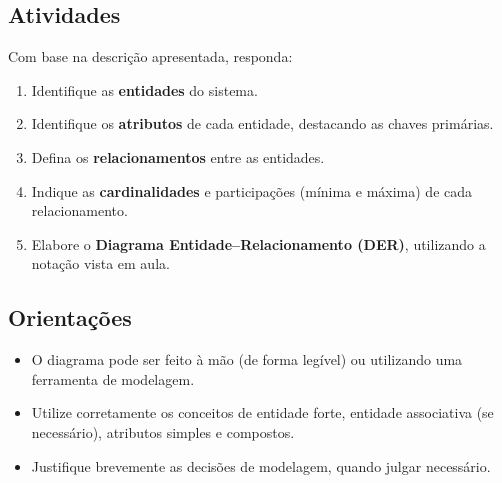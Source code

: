 \documentclass[12pt]{article}
\begin{document}
\subsection*{Atividades}

Com base na descrição apresentada, responda:

\begin{enumerate}
  \item Identifique as \textbf{entidades} do sistema.
  \item Identifique os \textbf{atributos} de cada entidade, destacando as chaves primárias.
  \item Defina os \textbf{relacionamentos} entre as entidades.
  \item Indique as \textbf{cardinalidades} e participações (mínima e máxima) de cada relacionamento.
  \item Elabore o \textbf{Diagrama Entidade--Relacionamento (DER)}, utilizando a notação vista em aula.
\end{enumerate}

\subsection*{Orientações}

\begin{itemize}
  \item O diagrama pode ser feito à mão (de forma legível) ou utilizando uma ferramenta de modelagem.
  \item Utilize corretamente os conceitos de entidade forte, entidade associativa (se necessário), atributos simples e compostos.
  \item Justifique brevemente as decisões de modelagem, quando julgar necessário.
\end{itemize}

    
    


\end{document}
